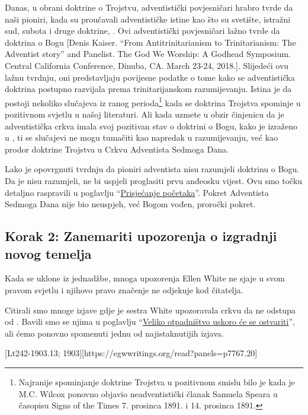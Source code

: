 Danas, u obrani doktrine o Trojstvu, adventistički povjesničari hrabro tvrde da naši pioniri, kada su proučavali adventističke istine kao što su svetište, istražni sud, subota i druge doktrine, . Ovi adventistički povjesničari lažno tvrde da doktrina o Bogu [Denis Kaiser. “From Antitrinitarianism to Trinitarianism: The Adventist story” and Panelist. The God We Worship: A Godhead Symposium. Central California Conference, Dinuba, CA. March 23-24, 2018.]. Slijedeći ovu lažnu tvrdnju, oni predstavljaju povijesne podatke o tome kako se adventistička doktrina postupno razvijala prema trinitarijanskom razumijevanju. Istina je da postoji nekoliko slučajeva iz ranog perioda\footnote{Najranije spominjanje doktrine Trojstva u pozitivnom smislu bilo je kada je M.C. Wilcox ponovno objavio neadventistički članak Samuela Speara u časopisu Signs of the Times 7. prosinca 1891. i 14. prosinca 1891.} kada se doktrina Trojstva spominje u pozitivnom svjetlu u našoj literaturi. Ali kada uzmete u obzir činjenicu da je adventistička crkva imala svoj pozitivan stav o doktrini o Bogu, kako je izraženo u , ti se slučajevi ne mogu tumačiti kao napredak u razumijevanju, već kao prodor doktrine Trojstva u Crkvu Adventista Sedmoga Dana.

Lako je opovrgnuti tvrdnju da pioniri adventista nisu razumjeli doktrinu o Bogu. Da je nisu razumjeli, ne bi uspjeli proglasiti prvu anđeosku vijest. Ovu smo točku detaljno raspravili u poglavlju “\hyperref[chap:remembering-the-beginning]{Prisjećanje početaka}”. Pokret Adventista Sedmoga Dana nije bio neuspjeh, već Bogom vođen, proročki pokret.

\subsection*{Korak 2: Zanemariti upozorenja o izgradnji novog temelja}

Kada se  uklone iz jednadžbe, mnoga upozorenja Ellen White ne sjaje u svom pravom svjetlu i njihovo pravo značenje ne odjekuje kod čitatelja.

Citirali smo mnoge izjave gdje je sestra White upozoravala crkvu da ne odstupa od . Bavili smo se njima u poglavlju “\hyperref[chap:apostasy]{Veliko otpadništvo uskoro će se ostvariti}”, ali ćemo ponovno spomenuti jednu od najistaknutijih izjava.

[Lt242-1903.13; 1903][https://egwwritings.org/read?panels=p7767.20]

